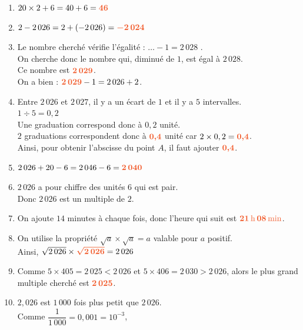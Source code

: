 \documentclass[a4paper,11pt]{article}
\begin{document}
\newpage \begin{seance}{} %

\begin{enumerate}
\item $20 \times 2+6=40+6={\color[HTML]{f15929}\boldsymbol{46}}$
	\item $2-2\,026=2+(-2\,026)={\color[HTML]{f15929}\boldsymbol{-2\,024}}$
	\item Le nombre cherché vérifie  l'égalité : 
       $\ldots -1=2\,028$ .\\
       On cherche donc le nombre qui, diminué de $1$, est égal à   $2\,028$. \\
       Ce nombre est ${\color[HTML]{f15929}\boldsymbol{2\,029}}$. \\
       On a bien : ${\color[HTML]{f15929}\boldsymbol{2\,029}} -1=2\,026+2 $.
	\item Entre $2\,026$ et $2\,027$, il y a un écart de $1$ et il y a $5$ intervalles.\\
       $1 \div 5 = 0,2$\\
            Une graduation correspond donc à $0,2$ unité. \\$2$ graduations correspondent donc à ${\color[HTML]{f15929}\boldsymbol{0{,}4}}$ unité car $2\times 0,2 = {\color[HTML]{f15929}\boldsymbol{0{,}4}}$. \\Ainsi, pour obtenir l'abscisse du point $A$, il faut ajouter ${\color[HTML]{f15929}\boldsymbol{0{,}4}}$.
	\item $2\,026 + 20 -  6=2\,046 -  6={\color[HTML]{f15929}\boldsymbol{2\,040}}$
	\item $2\,026$ a pour chiffre des unités $6$ qui est pair. \\
      Donc $2\,026$ est un multiple de $2$.
	\item On ajoute $14$ minutes à chaque fois, donc l'heure qui suit est ${\color[HTML]{f15929}\boldsymbol{21\,\text{h}\,08\,\text{min}}}$.
	\item On utilise la propriété $\sqrt{a}\times \sqrt{a} =a$ valable pour $a$ positif.\\
        Ainsi, $\sqrt{2\,026}\times{\color[HTML]{f15929}\boldsymbol{\sqrt{2\,026}}}=2\,026$
	\item Comme $5\times 405 =2\,025 < 2\,026$ et
  $ 5\times406=2\,030 > 2\,026$,
  alors le plus grand multiple cherché est ${\color[HTML]{f15929}\boldsymbol{2\,025}}$.
	\item $2{,}026$ est $1\,000$ fois plus petit que $2\,026$.\\
        Comme $\dfrac{1}{1\,000}=0{,}001=10^{-3}$, 

\end{enumerate}
\end{seance}
\end{document}
